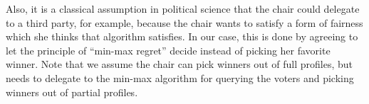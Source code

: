 \documentclass{article}
\newcommand{\commentOC}[1]{\textcolor{blue}{\small$\big[$OC: #1$\big]$}}
\newcommand{\commentBN}[1]{\textcolor{magenta}{\small$\big[$BN: #1$\big]$}}
\begin{document}
Also, it is a classical assumption in political science that the chair could delegate to a third party, for example, because the chair wants to satisfy a form of fairness which she thinks that algorithm satisfies. In our case, this is done by agreeing to let the principle of “min-max regret” decide instead of picking her favorite winner. Note that we assume the chair can pick winners out of full profiles, but needs to delegate to the min-max algorithm for querying the voters and picking winners out of partial profiles.




%
\end{document}
